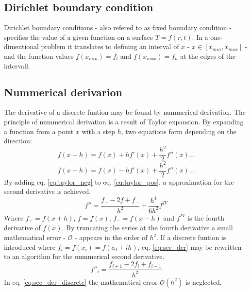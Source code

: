 \documentclass[twoside,twocolumn]{article}
\begin{document}
\subsection{Dirichlet boundary condition}
Dirichlet boundary conditions - also refered to as fixed boundary condition - specifies the value of a given function on a surface $T=f(r,t)$. In a one-dimentional problem it translates to defining an interval of $x$ - $x\in [x_{min},x_{max}]$ - and the function values $f(x_{min})=f_l$ and $f(x_{max})=f_h$ at the edges of the intervall.

\subsection{Nummerical derivarion}
The derivative of a discrete funtion may be found by nummerical derivation. The principle of nummerical derivation is a result of Taylor expansion. By expanding a function from   a point $x$ with a step $h$, two equations form depending on the direction:
\begin{equation}
f(x+h) = f(x)+hf'(x)+\frac{h^2}{2}f''(x)\ldots \label{eq:taylor_pos}
\end{equation}
\begin{equation}
f(x-h) = f(x)-hf'(x)+\frac{h^2}{2}f''(x)\ldots \label{eq:taylor_neg}
\end{equation}
By adding eq. \ref{eq:taylor_neg} to eq. \ref{eq:taylor_pos}, a approximation for the second derivative is achieved.
\begin{equation}
f'' = \frac{f_+-2f+f_-}{h^2}+\frac{h^4}{6h^2}f^{\mathit{IV}}\label{eq:sec_der}
\end{equation}
Where $f_+ = f(x+h)$, $f=f(x)$, $f_-=f(x-h)$ and $f^{IV}$ is the fourth derivative of $f(x)$. By truncating the series at the fourth derivative a small mathematical error - $\mathcal{O}$ - appears in the order of $h^2$. If a discrete funtion is introduced where $f_i = f(x_i) = f(c_0+ih)$, eq. \ref{eq:sec_der} may be rewritten to an algorithm for the nummerical second derivative.
\begin{equation}
f''_i = \frac{f_{i+1}-2f_i+f_{i-1}}{h^2}\label{eq:sec_der_discrete}
\end{equation}
In eq. \ref{eq:sec_der_discrete} the mathematical error $\mathcal{O}(h^2)$ is neglected.
\end{document}
